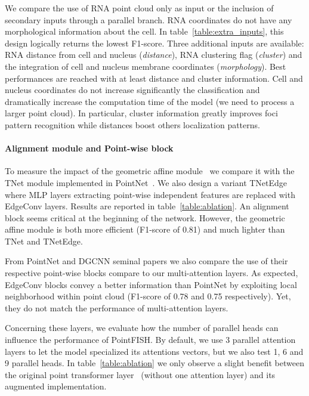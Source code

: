 We compare the use of \ac{RNA} point cloud only as input or the inclusion of secondary inputs through a parallel branch.
\ac{RNA} coordinates do not have any morphological information about the cell.
In table~\ref{table:extra_inputs}, this design logically returns the lowest F1-score.
Three additional inputs are available: \ac{RNA} distance from cell and nucleus (\emph{distance}), \ac{RNA} clustering flag (\emph{cluster}) and the integration of cell and nucleus membrane coordinates (\emph{morphology}).
Best performances are reached with at least distance and cluster information.
Cell and nucleus coordinates do not increase significantly the classification and dramatically increase the computation time of the model (we need to process a larger point cloud).
In particular, cluster information greatly improves foci pattern recognition while distances boost others localization patterns.

\paragraph{Alignment module and Point-wise block}

To measure the impact of the geometric affine module~\cite{ma2022rethinking} we compare it with the TNet module implemented in PointNet~\cite{Qi_2017_CVPR}.
We also design a variant TNetEdge where MLP layers extracting point-wise independent features are replaced with EdgeConv layers.
Results are reported in table~\ref{table:ablation}.
An alignment block seems critical at the beginning of the network.
However, the geometric affine module is both more efficient (F1-score of 0.81) and much lighter than TNet and TNetEdge.

From PointNet and DGCNN seminal papers we also compare the use of their respective point-wise blocks compare to our multi-attention layers.
As expected, EdgeConv blocks convey a better information than PointNet by exploiting local neighborhood within point cloud (F1-score of 0.78 and 0.75 respectively).
Yet, they do not match the performance of multi-attention layers.

Concerning these layers, we evaluate how the number of parallel heads can influence the performance of PointFISH.
By default, we use 3 parallel attention layers to let the model specialized its attentions vectors, but we also test 1, 6 and 9 parallel heads.
In table~\ref{table:ablation} we only observe a slight benefit between the original point transformer layer~\cite{Zhao_2021_ICCV} (without one attention layer) and its augmented implementation.

